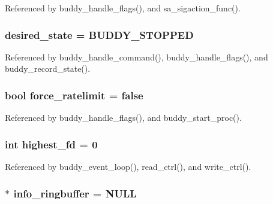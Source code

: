 Referenced by buddy\_\-handle\_\-flags(), and sa\_\-sigaction\_\-func().

\subsubsection[{desired\_\-state}]{ {\bf desired\_\-state} = BUDDY\_\-STOPPED\hspace{0.3cm}{\ttfamily  [static]}}\label{buddy_8c_a05901f7b8d5bf031b62c57221a69bff3}


Referenced by buddy\_\-handle\_\-command(), buddy\_\-handle\_\-flags(), and buddy\_\-record\_\-state().

\subsubsection[{force\_\-ratelimit}]{\setlength{\rightskip}{0pt plus 5cm}bool {\bf force\_\-ratelimit} = false\hspace{0.3cm}{\ttfamily  [static]}}\label{buddy_8c_a3e2d3cd0fd4a7c47cc37451ae453bf29}


Referenced by buddy\_\-handle\_\-flags(), and buddy\_\-start\_\-proc().

\subsubsection[{highest\_\-fd}]{\setlength{\rightskip}{0pt plus 5cm}int {\bf highest\_\-fd} = 0\hspace{0.3cm}{\ttfamily  [static]}}\label{buddy_8c_a15129627630d61eba3b083241572c781}


Referenced by buddy\_\-event\_\-loop(), read\_\-ctrl(), and write\_\-ctrl().

\subsubsection[{info\_\-ringbuffer}]{$\ast$ {\bf info\_\-ringbuffer} = NULL\hspace{0.3cm}{\ttfamily  [static]}}\label{buddy_8c_a5a216a38f05caa35201f9382808984b9}


